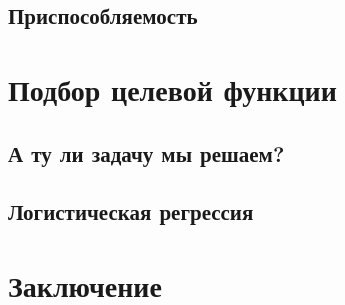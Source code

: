 \documentclass[14pt, fleqn, xcolor={dvipsnames, table}, hyperref={unicode}, babel={english,russian}, inputenc=utf8x]{beamer}
\begin{document}
\subsection{Приспособляемость}
\section{Подбор целевой функции}
\subsection{А ту ли задачу мы решаем?}
\subsection{Логистическая регрессия}
\section{Заключение}

\end{document}
